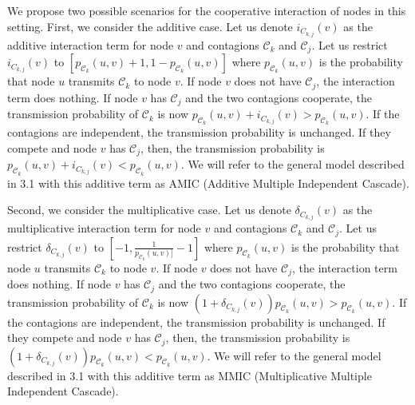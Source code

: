 \documentclass[11pt]{article}
\begin{document}
We propose two possible scenarios for the cooperative interaction of nodes in this setting. First, we consider the additive case. Let us denote $i_{C_{k,j}}(v)$ as the additive interaction term for node $v$ and contagions $\mathcal{C}_{k}$ and $\mathcal{C}_{j}$. Let us restrict $i_{C_{k,j}}(v)$ to $[p_{\mathcal{C}_{k}}(u,v)+1, 1-p_{\mathcal{C}_{k}}(u,v)]$ where $p_{\mathcal{C}_{k}}(u,v)$ is the probability that node $u$ transmits $\mathcal{C}_{k}$ to node $v$. If node $v$ does not have $\mathcal{C}_j$, the interaction term does nothing. If node $v$ has $\mathcal{C}_j$ and the two contagions cooperate, the transmission probability of $\mathcal{C}_k$ is now $p_{\mathcal{C}_{k}}(u,v) + i_{C_{k,j}}(v) > p_{\mathcal{C}_{k}}(u,v)$. If the contagions are independent, the transmission probability is unchanged. If they compete and node $v$ has $\mathcal{C}_j$, then,  the transmission probability is $p_{\mathcal{C}_{k}}(u,v) + i_{C_{k,j}}(v) < p_{\mathcal{C}_{k}}(u,v)$. We will refer to the general model described in 3.1 with this additive term as AMIC (Additive Multiple Independent Cascade). 

Second, we consider the multiplicative case. Let us denote $\delta_{C_{k,j}}(v)$ as the multiplicative interaction term for node $v$ and contagions $\mathcal{C}_{k}$ and $\mathcal{C}_{j}$. Let us restrict $\delta_{C_{k,j}}(v)$ to $[-1, \frac{1}{{p_{\mathcal{C}_{k}}(u,v)]}} - 1]$ where $p_{\mathcal{C}_{k}}(u,v)$ is the probability that node $u$ transmits $\mathcal{C}_{k}$ to node $v$. If node $v$ does not have $\mathcal{C}_j$, the interaction term does nothing. If node $v$ has $\mathcal{C}_j$ and the two contagions cooperate, the transmission probability of $\mathcal{C}_k$ is now $(1 + \delta_{C_{k,j}}(v))p_{\mathcal{C}_{k}}(u,v) > p_{\mathcal{C}_{k}}(u,v)$. If the contagions are independent, the transmission probability is unchanged. If they compete and node $v$ has $\mathcal{C}_j$, then,  the transmission probability is $(1 + \delta_{C_{k,j}}(v))p_{\mathcal{C}_{k}}(u,v) < p_{\mathcal{C}_{k}}(u,v)$. We will refer to the general model described in 3.1 with this additive term as MMIC (Multiplicative Multiple Independent Cascade).
\end{document}
